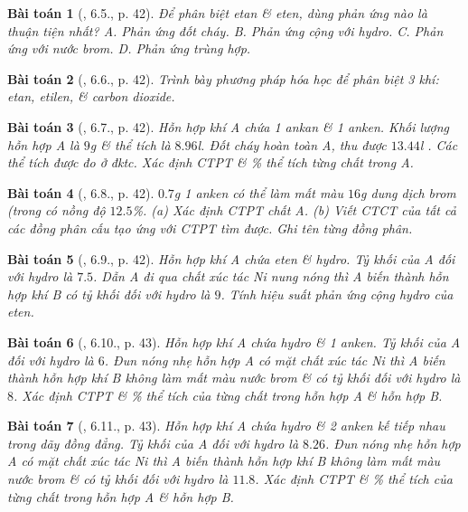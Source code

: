 \documentclass{article}
\newtheorem{baitoan}{Bài toán}
\begin{document}
\begin{baitoan}[\cite{SBT_Hoa_Hoc_11_co_ban}, 6.5., p. 42]
	Để phân biệt etan \& eten, dùng phản ứng nào là thuận tiện nhất? {\sf A.} Phản ứng đốt cháy. {\sf B.} Phản ứng cộng với hydro. {\sf C.} Phản ứng với nước brom. {\sf D.} Phản ứng trùng hợp.
\end{baitoan}

\begin{baitoan}[\cite{SBT_Hoa_Hoc_11_co_ban}, 6.6., p. 42]
	Trình bày phương pháp hóa học để phân biệt 3 khí: etan, etilen, \& carbon dioxide.
\end{baitoan}

\begin{baitoan}[\cite{SBT_Hoa_Hoc_11_co_ban}, 6.7., p. 42]
	Hỗn hợp khí A chứa 1 ankan \& 1 anken. Khối lượng hỗn hợp A là $9$\emph{g} \& thể tích là $8.96$\emph{l}. Đốt cháy hoàn toàn A, thu được $13.44$\emph{l} \emph{}. Các thể tích được đo ở đktc. Xác định CTPT \& \% thể tích từng chất trong A.
\end{baitoan}

\begin{baitoan}[\cite{SBT_Hoa_Hoc_11_co_ban}, 6.8., p. 42]
	$0.7$\emph{g} 1 anken có thể làm mất màu $16$\emph{g} dung dịch brom (trong \emph{} có nồng độ $12.5$\%. (a) Xác định CTPT chất A. (b) Viết CTCT của tất cả các đồng phân cấu tạo ứng với CTPT tìm được. Ghi tên từng đồng phân.
\end{baitoan}

\begin{baitoan}[\cite{SBT_Hoa_Hoc_11_co_ban}, 6.9., p. 42]
	Hỗn hợp khí A chứa eten \& hydro. Tỷ khối của A đối với hydro là $7.5$. Dẫn A đi qua chất xúc tác \emph{Ni} nung nóng thì A biến thành hỗn hợp khí B có tỷ khối đối với hydro là $9$. Tính hiệu suất phản ứng cộng hydro của eten.
\end{baitoan}

\begin{baitoan}[\cite{SBT_Hoa_Hoc_11_co_ban}, 6.10., p. 43]
	Hỗn hợp khí A chứa hydro \& 1 anken. Tỷ khối của A đối với hydro là $6$. Đun nóng nhẹ hỗn hợp A có mặt chất xúc tác \emph{Ni} thì A biến thành hỗn hợp khí B không làm mất màu nước brom \& có tỷ khối đối với hydro là $8$. Xác định CTPT \& \% thể tích của từng chất trong hỗn hợp A \& hỗn hợp B.
\end{baitoan}

\begin{baitoan}[\cite{SBT_Hoa_Hoc_11_co_ban}, 6.11., p. 43]
	Hỗn hợp khí A chứa hydro \& 2 anken kế tiếp nhau trong dãy đồng đẳng. Tỷ khối của A đối với hydro là $8.26$. Đun nóng nhẹ hỗn hợp A có mặt chất xúc tác \emph{Ni} thì A biến thành hỗn hợp khí B không làm mất màu nước brom \& có tỷ khối đối với hydro là $11.8$. Xác định CTPT \& \% thể tích của từng chất trong hỗn hợp A \& hỗn hợp B.
\end{baitoan}
\end{document}
